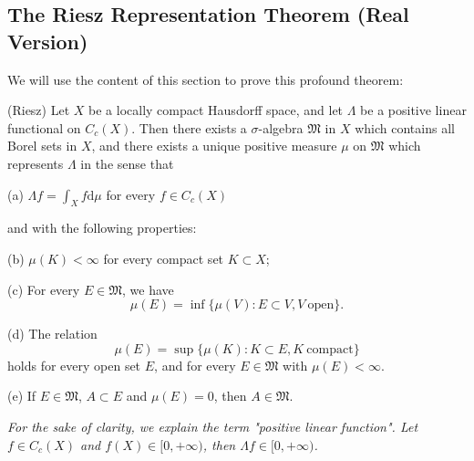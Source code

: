 \subsection{The Riesz Representation Theorem (Real Version)}
We will use the content of this section to prove this profound theorem:
\begin{theorem}(Riesz)
Let $X$ be a locally compact Hausdorff space, and let $\Lambda$ be a positive linear functional on $C_c(X)$. Then there exists a $\sigma$-algebra $\mathfrak{M}$ in $X$ which contains all Borel sets in $X$, and there exists a unique positive measure $\mu$ on $\mathfrak{M}$ which represents $\Lambda$ in the sense that \par
(a) $\Lambda f=\int_Xf\mathrm{d}\mu$ for every $f\in C_c(X)$\par
and with the following properties:\par
(b) $\mu(K)<\infty$ for every compact set $K\subset X$;\par
(c) For every $E\in\mathfrak{M}$, we have 
$$\mu(E)=\inf\{\mu(V):E\subset V, V\ \text{open}\}.$$\par
(d) The relation 
$$\mu(E)=\sup\{\mu(K):K\subset E, K\ \text{compact}\}$$
holds for every open set $E$, and for every $E\in\mathfrak{M}$ with $\mu(E)<\infty$.\par
(e) If $E\in\mathfrak{M}$, $A\subset E$ and $\mu(E)=0$, then $A\in\mathfrak{M}$.
\end{theorem}
\begin{note}\em
For the sake of clarity, we explain the term "positive linear function". Let $f\in C_c(X)$ and $f(X)\in[0,+\infty)$, then $\Lambda f\in[0,+\infty)$.
\end{note}
